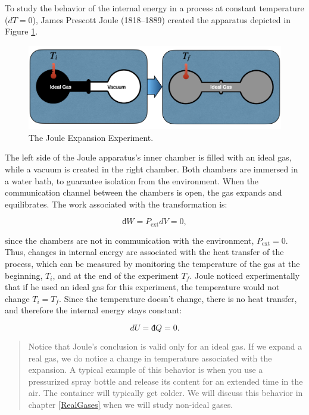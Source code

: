 \documentclass[
  9pt,
]{extbook}
\theoremstyle{definition}
\theoremstyle{definition}
\theoremstyle{definition}
\theoremstyle{remark}
\begin{document}
To study the behavior of the internal energy in a process at constant temperature (\(dT=0\)), James Prescott Joule (1818--1889) created the apparatus depicted in Figure \ref{fig:FigJexp}.

\begin{figure}

{\centering \includegraphics[width=0.8\linewidth]{./img/OEP_Figures.006} 

}

\caption{The Joule Expansion Experiment.}\label{fig:FigJexp}
\end{figure}

The left side of the Joule apparatus's inner chamber is filled with an ideal gas, while a vacuum is created in the right chamber. Both chambers are immersed in a water bath, to guarantee isolation from the environment. When the communication channel between the chambers is open, the gas expands and equilibrates. The work associated with the transformation is:

\begin{equation}
  đ W=P_{\text{ext}}dV = 0,
  \label{eq:JexpW}
\end{equation}

since the chambers are not in communication with the environment, \(P_{\text{ext}}=0\). Thus, changes in internal energy are associated with the heat transfer of the process, which can be measured by monitoring the temperature of the gas at the beginning, \(T_i\), and at the end of the experiment \(T_f\). Joule noticed experimentally that if he used an ideal gas for this experiment, the temperature would not change \(T_i = T_f\). Since the temperature doesn't change, there is no heat transfer, and therefore the internal energy stays constant:

\begin{equation}
  dU = đ Q = 0.
  \label{eq:JexpQU}
\end{equation}

\begin{quote}
Notice that Joule's conclusion is valid only for an ideal gas. If we expand a real gas, we do notice a change in temperature associated with the expansion. A typical example of this behavior is when you use a pressurized spray bottle and release its content for an extended time in the air. The container will typically get colder. We will discuss this behavior in chapter \ref{RealGases} when we will study non-ideal gases.
\end{quote}
\end{document}
